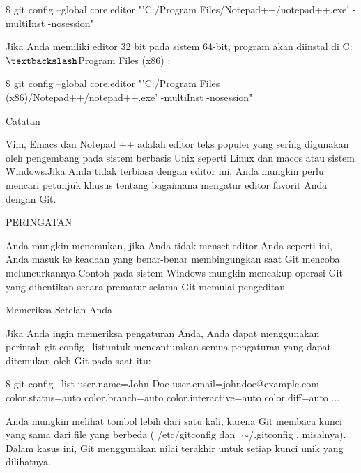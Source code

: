 \vspace{12pt}
\noindent 
  $  \$  $ git config --global core.editor "'C:/Program Files/Notepad++/notepad++.exe' -multiInst -nosession"  \par
\vspace{12pt}
\noindent 
Jika Anda memiliki editor 32 bit pada sistem 64-bit, program akan diinstal di $  $C: $  \textbackslash  $Program Files (x86) $  $: \par
\vspace{12pt}
\noindent 
  $  \$  $ git config --global core.editor "'C:/Program Files (x86)/Notepad++/notepad++.exe' -multiInst -nosession"  \par
\vspace{12pt}
\noindent 
Catatan \par
\vspace{12pt}
\noindent 
Vim, Emacs dan Notepad ++ adalah editor teks populer yang sering digunakan oleh pengembang pada sistem berbasis Unix seperti Linux dan macos atau sistem Windows.Jika Anda tidak terbiasa dengan editor ini, Anda mungkin perlu mencari petunjuk khusus tentang bagaimana mengatur editor favorit Anda dengan Git. \par
\vspace{12pt}
\noindent 
PERINGATAN \par
\vspace{12pt}
\noindent 
Anda mungkin menemukan, jika Anda tidak menset editor Anda seperti ini, Anda masuk ke keadaan yang benar-benar membingungkan saat Git mencoba meluncurkannya.Contoh pada sistem Windows mungkin mencakup operasi Git yang dihentikan secara prematur selama Git memulai pengeditan \par
\vspace{12pt}
\noindent 
Memeriksa Setelan Anda \par
\vspace{12pt}
\noindent 
Jika Anda ingin memeriksa pengaturan Anda, Anda dapat menggunakan perintah $  $git config --listuntuk mencantumkan semua pengaturan yang dapat ditemukan oleh Git pada saat itu: \par
\vspace{12pt}
\noindent 
  $  \$  $ git config --list user.name=John Doe user.email=johndoe@example.com color.status=auto color.branch=auto color.interactive=auto color.diff=auto ...  \par
\vspace{12pt}
\noindent 
Anda mungkin melihat tombol lebih dari satu kali, karena Git membaca kunci yang sama dari file yang berbeda ( $  $/etc/gitconfig $  $dan $  $ $  \sim  $/.gitconfig $  $, misalnya). $  $Dalam kasus ini, Git menggunakan nilai terakhir untuk setiap kunci unik yang dilihatnya. \par
